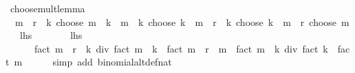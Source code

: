 \begin{isabellebody}
\endisatagproof
{\isafoldproof}%
%
\isadelimproof
\isanewline
%
\endisadelimproof
\isanewline
{}\isamarkupfalse%
\ choose{\isacharunderscore}{\kern0pt}mult{\isacharunderscore}{\kern0pt}lemma{\isacharcolon}{\kern0pt}\isanewline
\ \ {\isachardoublequoteopen}{\isacharparenleft}{\kern0pt}{\isacharparenleft}{\kern0pt}m\ {\isacharplus}{\kern0pt}\ r\ {\isacharplus}{\kern0pt}\ k{\isacharparenright}{\kern0pt}\ choose\ {\isacharparenleft}{\kern0pt}m\ {\isacharplus}{\kern0pt}\ k{\isacharparenright}{\kern0pt}{\isacharparenright}{\kern0pt}\ {\isacharasterisk}{\kern0pt}\ {\isacharparenleft}{\kern0pt}{\isacharparenleft}{\kern0pt}m\ {\isacharplus}{\kern0pt}\ k{\isacharparenright}{\kern0pt}\ choose\ k{\isacharparenright}{\kern0pt}\ {\isacharequal}{\kern0pt}\ {\isacharparenleft}{\kern0pt}{\isacharparenleft}{\kern0pt}m\ {\isacharplus}{\kern0pt}\ r\ {\isacharplus}{\kern0pt}\ k{\isacharparenright}{\kern0pt}\ choose\ k{\isacharparenright}{\kern0pt}\ {\isacharasterisk}{\kern0pt}\ {\isacharparenleft}{\kern0pt}{\isacharparenleft}{\kern0pt}m\ {\isacharplus}{\kern0pt}\ r{\isacharparenright}{\kern0pt}\ choose\ m{\isacharparenright}{\kern0pt}{\isachardoublequoteclose}\isanewline
\ \ {\isacharparenleft}{\kern0pt}\ {\isachardoublequoteopen}{\isacharquery}{\kern0pt}lhs\ {\isacharequal}{\kern0pt}\ {\isacharunderscore}{\kern0pt}{\isachardoublequoteclose}{\isacharparenright}{\kern0pt}\isanewline
%
\isadelimproof
%
\endisadelimproof
%
\isatagproof
{}\isamarkupfalse%
\ {\isacharminus}{\kern0pt}\isanewline
\ \ \isamarkupfalse%
\ {\isachardoublequoteopen}{\isacharquery}{\kern0pt}lhs\ {\isacharequal}{\kern0pt}\isanewline
\ \ \ \ \ \ fact\ {\isacharparenleft}{\kern0pt}m\ {\isacharplus}{\kern0pt}\ r\ {\isacharplus}{\kern0pt}\ k{\isacharparenright}{\kern0pt}\ div\ {\isacharparenleft}{\kern0pt}fact\ {\isacharparenleft}{\kern0pt}m\ {\isacharplus}{\kern0pt}\ k{\isacharparenright}{\kern0pt}\ {\isacharasterisk}{\kern0pt}\ fact\ {\isacharparenleft}{\kern0pt}m\ {\isacharplus}{\kern0pt}\ r\ {\isacharminus}{\kern0pt}\ m{\isacharparenright}{\kern0pt}{\isacharparenright}{\kern0pt}\ {\isacharasterisk}{\kern0pt}\ {\isacharparenleft}{\kern0pt}fact\ {\isacharparenleft}{\kern0pt}m\ {\isacharplus}{\kern0pt}\ k{\isacharparenright}{\kern0pt}\ div\ {\isacharparenleft}{\kern0pt}fact\ k\ {\isacharasterisk}{\kern0pt}\ fact\ m{\isacharparenright}{\kern0pt}{\isacharparenright}{\kern0pt}{\isachardoublequoteclose}\isanewline
\ \ \ \ \isamarkupfalse%
\ {\isacharparenleft}{\kern0pt}simp\ add{\isacharcolon}{\kern0pt}\ binomial{\isacharunderscore}{\kern0pt}altdef{\isacharunderscore}{\kern0pt}nat{\isacharparenright}{\kern0pt}\isanewline

\end{isabellebody}
